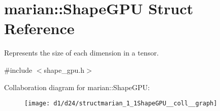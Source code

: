 \hypertarget{structmarian_1_1ShapeGPU}{}\section{marian\+:\+:Shape\+G\+PU Struct Reference}
\label{structmarian_1_1ShapeGPU}


Represents the size of each dimension in a tensor.  




{\ttfamily \#include $<$shape\+\_\+gpu.\+h$>$}



Collaboration diagram for marian\+:\+:Shape\+G\+PU\+:
\nopagebreak
\begin{figure}[H]
\begin{center}
\leavevmode
\texttt{[image: d1/d24/structmarian\_1\_1ShapeGPU\_\_coll\_\_graph]}
\end{center}
\end{figure}
